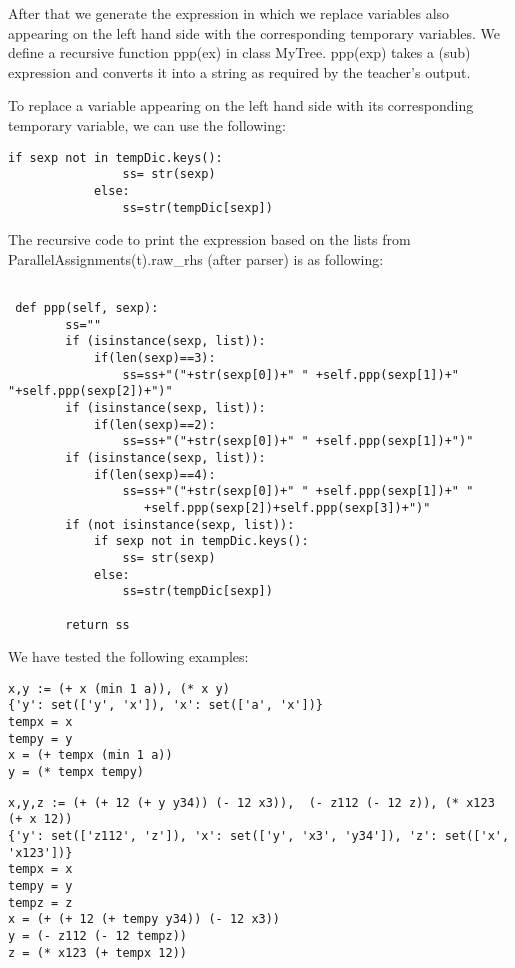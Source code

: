 \documentclass{article}
\begin{document}
After that we generate the expression in which we replace variables also appearing on the left hand side with the corresponding temporary variables. We define a recursive function ppp(ex)  in class  MyTree. ppp(exp) takes a (sub) expression and converts it into a string as required by the teacher's output.


To replace a variable appearing on the left hand side with its corresponding temporary variable, we can use the following:
\begin{verbatim}
if sexp not in tempDic.keys():
                ss= str(sexp)
            else:
                ss=str(tempDic[sexp])
\end{verbatim}

The recursive code to print the expression based on the lists from ParallelAssignments(t).raw\_rhs (after parser) is as following:



\begin{verbatim}

 def ppp(self, sexp):
        ss=""
        if (isinstance(sexp, list)):
            if(len(sexp)==3):
                ss=ss+"("+str(sexp[0])+" " +self.ppp(sexp[1])+" "+self.ppp(sexp[2])+")"
        if (isinstance(sexp, list)):
            if(len(sexp)==2):
                ss=ss+"("+str(sexp[0])+" " +self.ppp(sexp[1])+")"
        if (isinstance(sexp, list)):
            if(len(sexp)==4):
                ss=ss+"("+str(sexp[0])+" " +self.ppp(sexp[1])+" "
                   +self.ppp(sexp[2])+self.ppp(sexp[3])+")"
        if (not isinstance(sexp, list)):
            if sexp not in tempDic.keys():
                ss= str(sexp)
            else:
                ss=str(tempDic[sexp])

        return ss
\end{verbatim}

\noindent
We have tested the following examples: 

\begin{verbatim}
x,y := (+ x (min 1 a)), (* x y)
{'y': set(['y', 'x']), 'x': set(['a', 'x'])}
tempx = x
tempy = y
x = (+ tempx (min 1 a))
y = (* tempx tempy)
\end{verbatim}

\begin{verbatim}
x,y,z := (+ (+ 12 (+ y y34)) (- 12 x3)),  (- z112 (- 12 z)), (* x123  (+ x 12))
{'y': set(['z112', 'z']), 'x': set(['y', 'x3', 'y34']), 'z': set(['x', 'x123'])}
tempx = x
tempy = y
tempz = z
x = (+ (+ 12 (+ tempy y34)) (- 12 x3))
y = (- z112 (- 12 tempz))
z = (* x123 (+ tempx 12))
\end{verbatim}
\end{document}
